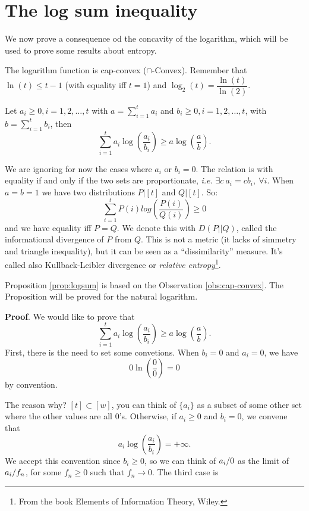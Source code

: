 \chapter{The log sum inequality}
We now prove a consequence od the concavity of the logarithm, which will be used to prove some results about entropy.

\begin{obs}\label{obs:cap-convex}
	The logarithm function is cap-convex ($\cap$-Convex). Remember that $\ln(t) \leq t - 1$ (with equality iff $t=1$) and $\log_2(t) = \dfrac{\ln(t)}{\ln(2)}$.
	
\end{obs}

\begin{prop}\label{prop:logsum}
	Let $a_i \geq 0, i = 1, 2, \ldots, t$ with $a = \sum_{i = 1}^t a_i$ and $b_i \geq 0, i = 1, 2, \ldots, t$, with $b = \sum_{i = 1}^t b_i$, then $$\sum_{i= 1}^ta_i\log\left(\dfrac{a_i}{b_i}\right)\geq a\log\left(\dfrac{a}{b}\right).$$
\end{prop}

We are ignoring for now the cases where $a_i$ or $b_i = 0$. The relation is with equality if and only if  the two sets are proportionate, \emph{i.e.} $\exists c\ a_i = cb_i,\ \forall i$. When $a = b = 1$ we have two distributions $P|[t]$ and $Q|[t]$. So:
\[
\sum_{i = 1}^tP(i)log\left(\dfrac{P(i)}{Q(i)}\right)\geq 0
 \]
 and we have equality iff $P = Q$. We denote this with $D(P||Q)$, called the informational divergence of $P$ from $Q$. This is not a metric (it lacks of simmetry and triangle inequality), but it can be seen as a ``dissimilarity'' measure. It's called also Kullback-Leibler divergence or \emph{relative entropy}\footnote{From the book Elements of Information Theory, Wiley.}. 
 
 Proposition \ref{prop:logsum} is based on the Observation \ref{obs:cap-convex}. The Proposition will be proved for the natural logarithm.
 
 \noindent\textbf{Proof}. We would like to prove that $$\sum_{i= 1}^ta_i\log\left(\dfrac{a_i}{b_i}\right)\geq a\log\left(\dfrac{a}{b}\right).$$First, there is the need to set some convetions. When $b_i = 0$ and $a_i = 0$, we have $$0\ln(\dfrac{0}{0}) = 0$$ by convention.
 
 The reason why? $[t] \subset [w]$, you can think of $\{a_i\}$ as a subset of some other set where the other values are all $0$'s. Otherwise, if $a_i \geq 0$ and $b_i = 0$, we convene that $$a_i\log\left(\dfrac{a_i}{b_i}\right) = +\infty.$$ We accept this convention since $b_i \geq 0$, so we can think of ${a_i}/{0}$ as the limit of ${a_i}/{f_n}$, for some $f_n\geq 0$ such that $f_n \rightarrow 0$. The third case is
 
